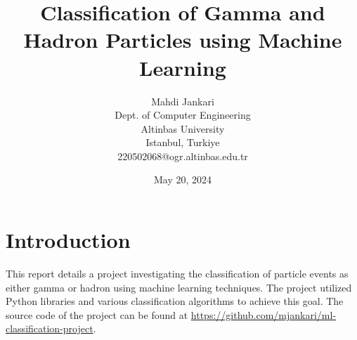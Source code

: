 \documentclass[a4paper, 12pt, titlepage]{article}
\title{Classification of Gamma and Hadron Particles using Machine Learning}
\author{
    Mahdi Jankari\\
    Dept. of Computer Engineering\\
    Altinbas University\\
    Istanbul, Turkiye\\
    220502068@ogr.altinbas.edu.tr
}
\date{May 20, 2024}
\begin{document}
\maketitle

\section{Introduction}

This report details a project investigating the classification of particle
events as either gamma or hadron using machine learning techniques. The project
utilized Python libraries and various classification algorithms to achieve this
goal. The source code of the project can be found at
\url{https://github.com/mjankari/ml-classification-project}.






\newpage
\nocite{*}
\printbibliography
\end{document}
